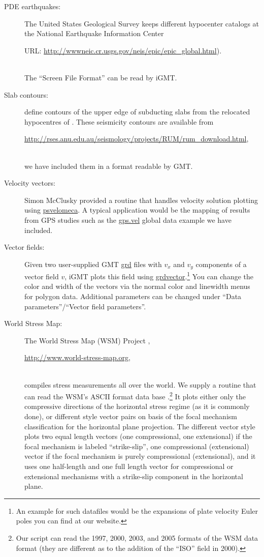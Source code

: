 \documentclass[11pt]{article}
\begin{document}
\begin{description}
\item[PDE earthquakes:] The United States Geological Survey keeps
  different hypocenter catalogs at the National Earthquake Information
  Center\\
  \centerline{URL: \url{http://wwwneic.cr.usgs.gov/neis/epic/epic_global.html}).}\\
  The ``Screen File Format'' can be read by iGMT.
  
\item[Slab contours:] \cite{gudmundsson98} define contours of the
  upper edge of subducting slabs from the relocated hypocentres of
  \cite{engdahl98}.
  These seismicity contours are available from\\
  \centerline{\url{http://rses.anu.edu.au/seismology/projects/RUM/rum_download.html},}\\
  we have included them in a format readable by GMT.

  
\item[Velocity vectors:] Simon McClusky provided a routine that
  handles velocity solution plotting using \url{psvelomeca}. A typical
  application would be the mapping of results from GPS studies such as
  the \url{gps.vel} global data example we have included.
  
  
\item[Vector fields:] Given two user-supplied GMT \url{grd} files with
  $v_x$ and $v_y$ components of a vector field $v$, iGMT plots this
  field using \url{grdvector}.\footnote{An example for such datafiles
    would be the expansions of plate velocity Euler poles you can find
    at our website.}  You can change the color and width of the
  vectors via the normal color and linewidth menus for polygon data.
  Additional parameters can be changed under ``Data
  parameters''/``Vector field parameters''.
  
\item[World Stress Map:] The World Stress Map (WSM) Project
  \cite[e.g.,][]{zoback92,mueller00,reinecker03},\\
  \centerline{\url{http://www.world-stress-map.org},}\\
  compiles stress measurements all over the world. We supply a routine
  that can read the WSM's ASCII format data base
  \citep{muellerb97,mueller00}.\footnote{Our script can read the 1997,
    2000, 2003, and 2005 formats of the WSM data format (they are
    different as to the addition of the ``ISO'' field in 2000).}  It
  plots either only the compressive directions of the horizontal
  stress regime (as it is commonly done), or different style vector
  pairs on basis of the focal mechanism classification for the
  horizontal plane projection. The different vector style plots two
  equal length vectors (one compressional, one extensional) if the
  focal mechanism is labeled ``strike-slip'', one compressional
  (extensional) vector if the focal mechanism is purely compressional
  (extensional), and it uses one half-length and one full length
  vector for compressional or extensional mechanisms with a
  strike-slip component in the horizontal plane.
  


\end{description}
\end{document}
